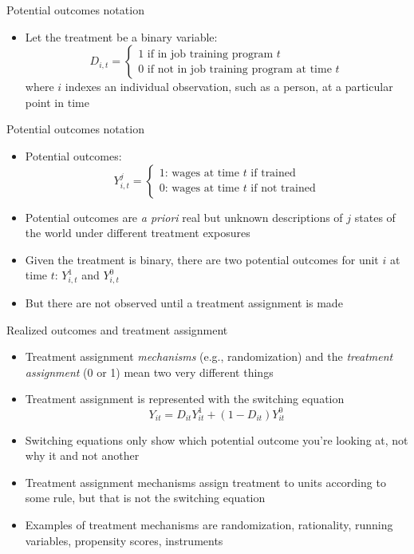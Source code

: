 \documentclass{beamer}
\begin{document}
\begin{frame}{Potential outcomes notation}
	
	
	\begin{itemize}
	\item Let the treatment be a binary variable: $$D_{i,t} =\begin{cases} 1 \text{ if in job training program $t$} \\ 0 \text{ if not in job training program at time $t$} \end{cases}$$where $i$ indexes an individual observation, such as a person, at a particular point in time

	\end{itemize}
\end{frame}

\begin{frame}{Potential outcomes notation}
	
	\begin{itemize}

\item Potential outcomes: $$Y_{i,t}^j =\begin{cases} 1 \text{: wages at time $t$ if trained} \\ 0 \text{: wages at time $t$ if not trained} \end{cases}$$
\item Potential outcomes are \emph{a priori} real but unknown descriptions of $j$ states of the world under different treatment exposures
\item Given the treatment is binary, there are two potential outcomes for unit $i$ at time $t$: $Y^1_{i,t}$ and $Y^0_{i,t}$
\item But there are not observed until a treatment assignment is made

	\end{itemize}
\end{frame}

\begin{frame}{Realized outcomes and treatment assignment}

\begin{itemize}
\item Treatment assignment \emph{mechanisms} (e.g., randomization) and the \emph{treatment assignment} (0 or 1) mean two very different things
\item Treatment assignment is represented with the switching equation 
 $$Y_{it}=D_{it}Y_{it}^1 + (1-D_{it})Y_{it}^0$$
 \item Switching equations only show which potential outcome you're looking at, not why it and not another
 \item Treatment assignment mechanisms assign treatment to units according to some rule, but that is not the switching equation
 \item Examples of treatment mechanisms are randomization, rationality, running variables, propensity scores, instruments

\end{itemize}
\end{frame}
\end{document}
